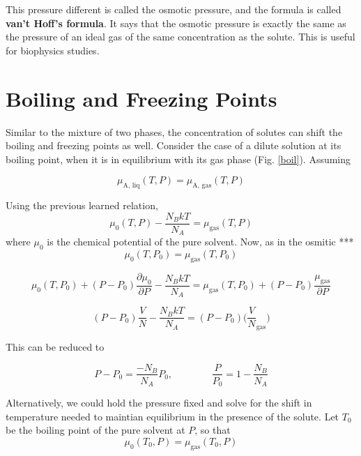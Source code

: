 This pressure different is called the osmotic pressure, and the formula is called \textbf{van't Hoff's formula}. It says that the osmotic pressure is exactly the same as the pressure of an ideal gas of the same concentration as the solute. This is useful for biophysics studies. 

\section{Boiling and Freezing Points}
Similar to the mixture of two phases, the concentration of solutes can shift the boiling and freezing points as well. Consider the case of a dilute solution at its boiling point, when it is in equilibrium with its gas phase (Fig. \ref{boil}). Assuming

\begin{equation}
    \mu_{\textrm{A, liq}}(T, P) = \mu_{\textrm{A, gas}}(T, P)
\end{equation}

Using the previous learned relation,
\begin{equation}
    \mu_0(T, P) - \frac{N_BkT}{N_A} = \mu_{\textrm{gas}}(T, P)
\end{equation}
where $\mu_0$ is the chemical potential of the pure solvent.
Now, as in the osmitic ***
\begin{equation}
    \mu_0(T, P_0) = \mu_{\textrm{gas}}(T, P_0)
\end{equation}

\begin{equation}
    \mu_0(T, P_0) + (P-P_0) \frac{\partial \mu_0}{\partial P} - \frac{N_BkT}{N_A} = \mu_{\textrm{gas}} (T, P_0) + (P-P_0) \frac{\mu_{\textrm{gas}}}{\partial P}
\end{equation}

\begin{equation}
    (P-P_0) \frac{V}{N} - \frac{N_BkT}{N_A} = (P-P_0) \bigg(\frac{V}{N}_{\textrm{gas}}\bigg)
\end{equation}

This can be reduced to

\begin{equation}
    P - P_0 = \frac{-N_B}{N_A} P_0, ~~~~~~~~~~~~~~~~~~ \frac{P}{P_0} = 1-\frac{N_B}{N_A}
\end{equation}

Alternatively, we could hold the pressure fixed and solve for the shift in temperature needed to maintian equilibrium in the presence of the solute. Let $T_0$ be the boiling point of the pure solvent at $P$, so that
\begin{equation}
    \mu_0(T_0, P) = \mu_{\textrm{gas}}(T_0, P)
\end{equation}

